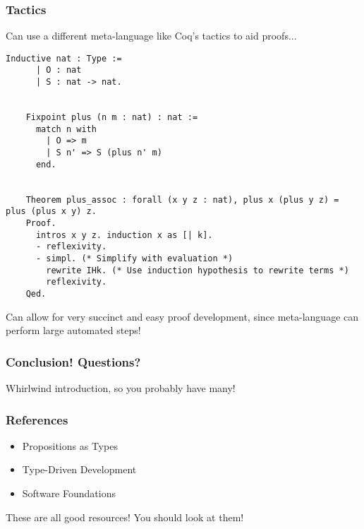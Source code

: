 \documentclass{beamer}
\begin{document}
\begin{frame}[fragile]
  \frametitle{Tactics}

  Can use a different meta-language like Coq's tactics to aid proofs...

  \pause
  \begin{lstlisting}[language=Coq]
    Inductive nat : Type :=
      | O : nat
      | S : nat -> nat.


    Fixpoint plus (n m : nat) : nat :=
      match n with
        | O => m
        | S n' => S (plus n' m)
      end.


    Theorem plus_assoc : forall (x y z : nat), plus x (plus y z) = plus (plus x y) z.
    Proof.
      intros x y z. induction x as [| k].
      - reflexivity.
      - simpl. (* Simplify with evaluation *)
        rewrite IHk. (* Use induction hypothesis to rewrite terms *)
        reflexivity.
    Qed.
  \end{lstlisting}

  \pause

  Can allow for very succinct and easy proof development, since meta-language can perform large automated steps!
\end{frame}

\begin{frame}
  \frametitle{Conclusion! Questions?}

  \huge{Whirlwind introduction, so you probably have many!}
\end{frame}

\begin{frame}
  \frametitle{References}

  \begin{itemize}
  \item Propositions as Types
  \item Type-Driven Development
  \item Software Foundations
  \end{itemize}

  These are all good resources! You should look at them!
\end{frame}
\end{document}
